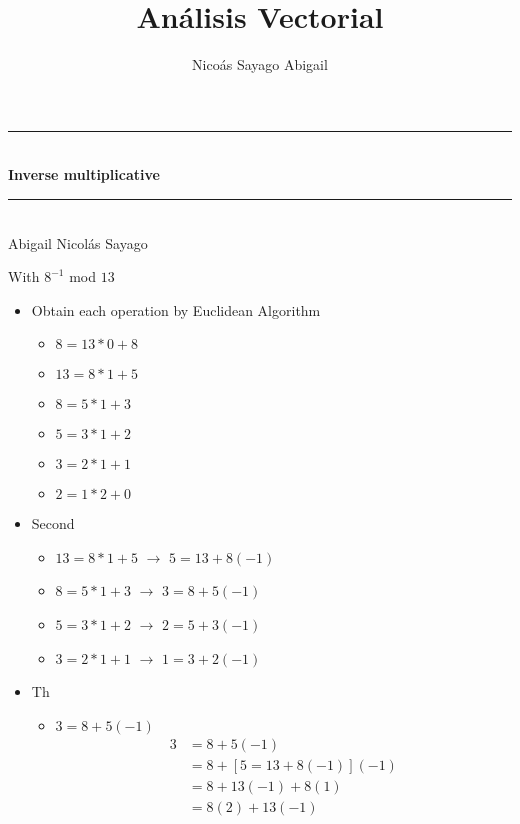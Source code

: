 \documentclass[12pt,openany]{book}
\title{An\'alisis Vectorial}
\author{Nico\'as Sayago Abigail}
\begin{document}
    \begin{titlepage}
        \centering
        \rule{\linewidth}{0.5mm} \\[1.0cm]
            { \huge \bfseries Inverse multiplicative}\\[1.0cm] 
        \rule{\linewidth}{0.5mm} \\[2.0cm]
        \centering
        Abigail Nicol\'as Sayago 
    \end{titlepage}
   

\tableofcontents

\newpage

	With $8^{-1}$ mod $13$
	
	\begin{itemize}
		\item Obtain each operation by Euclidean Algorithm
			\begin{itemize}
				\item[\Checkmark] $8 = 13 * 0 + 8$
				\item[\Checkmark] $13 = 8 * 1 + 5$
				\item[\Checkmark] $8 = 5 * 1 + 3$
				\item[\Checkmark] $5 = 3 * 1 + 2$
				\item[\Checkmark] $3 = 2 * 1 + 1$
				\item[\Checkmark] $2 = 1 * 2 + 0$	
			\end{itemize}

		\item Second
			\begin{itemize}
				\item[\Checkmark] $13 = 8 * 1 + 5$ $\longrightarrow$ $5 = 13 + 8(-1)$
				
				\item[\Checkmark] $8 = 5 * 1 + 3$ $\longrightarrow$ $3 = 8 + 5(-1)$
				
				\item[\Checkmark] $5 = 3 * 1 + 2$ $\longrightarrow$ $2 = 5 + 3(-1)$
				
				\item[\Checkmark] $3 = 2 * 1 + 1$ $\longrightarrow$ $1 = 3 + 2(-1)$
			\end{itemize}

		\item Th
			\begin{itemize}
				
				\item[\Checkmark] $3 = 8 + 5(-1)$
					\begin{equation*}
						\begin{split}
							3 &= 8 + 5(-1)	\\
							  &= 8 + \left[ 5 = 13 + 8(-1) \right](-1)	\\
							  &= 8 + 13(-1) + 8(1) \\
							  &= 8(2) + 13(-1)	\\
						\end{split}
					\end{equation*}


\end{itemize}
\end{itemize}
\end{document}
